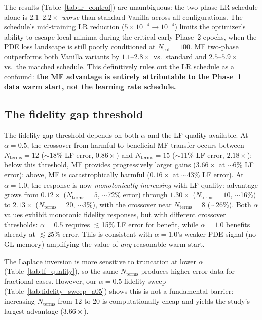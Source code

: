 \documentclass[preprint,12pt]{elsarticle}
\newcommand{\Ncol}{N_{\mathrm{col}}}
\begin{document}
The results (Table~\ref{tab:lr_control}) are unambiguous: the two-phase LR schedule alone is $2.1$--$2.2\times$ \emph{worse} than standard Vanilla across all configurations. The schedule's mid-training LR reduction ($5 \times 10^{-4} \to 10^{-4}$) limits the optimizer's ability to escape local minima during the critical early Phase~2 epochs, when the PDE loss landscape is still poorly conditioned at $\Ncol = 100$. MF two-phase outperforms both Vanilla variants by $1.1$--$2.8\times$ vs.\ standard and $2.5$--$5.9\times$ vs.\ the matched schedule. This definitively rules out the LR schedule as a confound: \textbf{the MF advantage is entirely attributable to the Phase~1 data warm start, not the learning rate schedule.}

\subsection{The fidelity gap threshold}

The fidelity gap threshold depends on both $\alpha$ and the LF quality available. At $\alpha = 0.5$, the crossover from harmful to beneficial MF transfer occurs between $N_{\mathrm{terms}} = 12$ ($\sim$18\% LF error, $0.86\times$) and $N_{\mathrm{terms}} = 15$ ($\sim$11\% LF error, $2.18\times$): below this threshold, MF provides progressively larger gains ($3.66\times$ at $\sim$6\% LF error); above, MF is catastrophically harmful ($0.16\times$ at $\sim$43\% LF error). At $\alpha = 1.0$, the response is now \emph{monotonically increasing} with LF quality: advantage grows from $0.12\times$ ($N_{\mathrm{terms}} = 5$, $\sim$72\% error) through $1.30\times$ ($N_{\mathrm{terms}} = 10$, $\sim$16\%) to $2.13\times$ ($N_{\mathrm{terms}} = 20$, $\sim$3\%), with the crossover near $N_{\mathrm{terms}} = 8$ ($\sim$26\%). Both $\alpha$ values exhibit monotonic fidelity responses, but with different crossover thresholds: $\alpha = 0.5$ requires $\lesssim$15\% LF error for benefit, while $\alpha = 1.0$ benefits already at $\lesssim$25\% error. This is consistent with $\alpha = 1.0$'s weaker PDE signal (no GL memory) amplifying the value of \emph{any} reasonable warm start.

The Laplace inversion is more sensitive to truncation at lower $\alpha$ (Table~\ref{tab:lf_quality}), so the same $N_{\mathrm{terms}}$ produces higher-error data for fractional cases. However, our $\alpha = 0.5$ fidelity sweep (Table~\ref{tab:fidelity_sweep_a05}) shows this is not a fundamental barrier: increasing $N_{\mathrm{terms}}$ from 12 to 20 is computationally cheap and yields the study's largest advantage ($3.66\times$).
\end{document}
